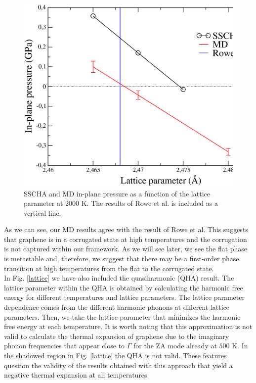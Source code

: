 \begin{figure}[ht]
\includegraphics[width=0.99\linewidth]{Figures/md2.eps}
\caption[Molecular dynamics results.]{SSCHA and MD in-plane pressure as a function of the lattice parameter at 
2000 K. The results of Rowe et al. is included as a vertical line.}
\label{md2}
\end{figure}
As we can see, our MD results agree with the result of Rowe et al. This suggests that graphene is in a corrugated 
state at high temperatures and the corrugation is not captured within our framework. As we will see later, we see 
the flat phase is metastable and, therefore, we suggest that there may be a first-order phase transition at high 
temperatures from the flat to the corrugated state. \\

In Fig. \ref{lattice} we have also included the quasiharmonic (QHA) result. The lattice parameter within 
the QHA is obtained by calculating the harmonic free energy for different temperatures and lattice parameters. The 
lattice parameter dependence comes from the different harmonic phonons at different lattice parameters. Then, we take 
the lattice parameter that minimizes the harmonic free energy at each temperature. It is worth noting that this 
approximation is not valid to calculate the thermal expansion of graphene due to the imaginary phonon frequencies 
that appear close to $\Gamma$ for the ZA mode already at $500$ K. In the shadowed region in Fig. \ref{lattice} the 
QHA is not valid. These features question the validity of the results obtained with this approach that yield a 
negative thermal expansion at all temperatures\cite{mounet2005first}.

